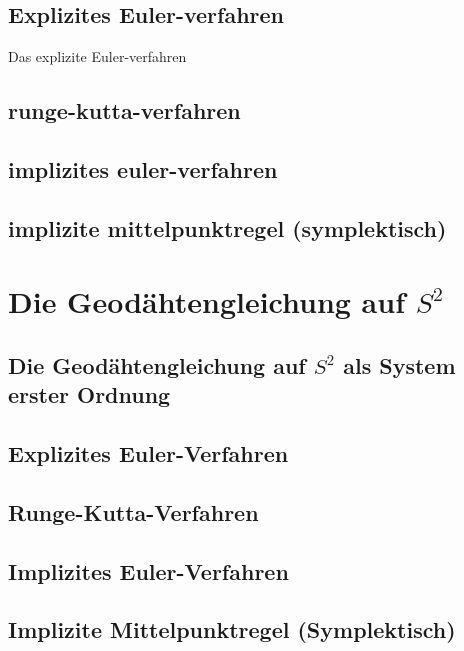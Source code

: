 \documentclass[18px, A4]{article}
\begin{document}
\subsection{Explizites Euler-verfahren}
Das explizite Euler-verfahren

\subsection{runge-kutta-verfahren}

\subsection{implizites euler-verfahren}

\subsection{implizite mittelpunktregel (symplektisch)}

\newpage


\section{Die Geodähtengleichung auf \(S^{2}\)}

\subsection{Die Geodähtengleichung auf \(S^{2}\) als System erster Ordnung}

\subsection{Explizites Euler-Verfahren}

\subsection{Runge-Kutta-Verfahren}

\subsection{Implizites Euler-Verfahren}

\subsection{Implizite Mittelpunktregel (Symplektisch)}

\newpage
\end{document}
